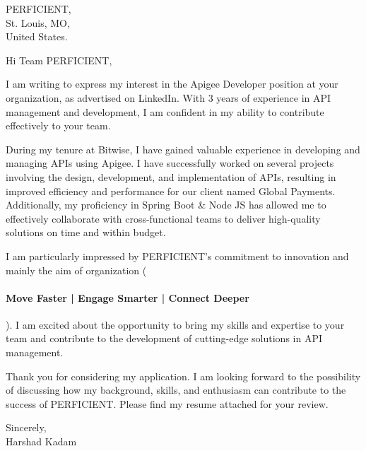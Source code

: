 \documentclass{letter}
\begin{document}
\begin{letter}{PERFICIENT, \\ St. Louis, MO, \\ United States.}

\opening{Hi Team PERFICIENT,}

I am writing to express my interest in the Apigee Developer position at your organization, as advertised on LinkedIn. With 3 years of experience in API management and development, I am confident in my ability to contribute effectively to your team.

During my tenure at Bitwise, I have gained valuable experience in developing and managing APIs using Apigee. I have successfully worked on several projects involving the design, development, and implementation of APIs, resulting in improved efficiency and performance for our client named Global Payments. Additionally, my proficiency in Spring Boot \& Node JS has allowed me to effectively collaborate with cross-functional teams to deliver high-quality solutions on time and within budget.

I am particularly impressed by PERFICIENT's commitment to innovation and mainly the aim of organization (\paragraph{Move Faster | Engage Smarter | Connect Deeper}). I am excited about the opportunity to bring my skills and expertise to your team and contribute to the development of cutting-edge solutions in API management.

Thank you for considering my application. I am looking forward to the possibility of discussing how my background, skills, and enthusiasm can contribute to the success of PERFICIENT. Please find my resume attached for your review.

\closing{Sincerely,\\Harshad Kadam}

\end{letter}
\end{document}
